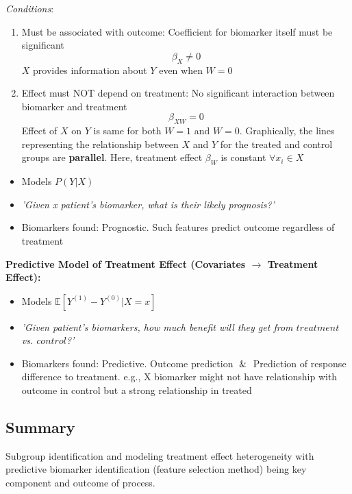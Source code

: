 \documentclass[../main.tex]{subfiles}
\begin{document}
\textit{Conditions}:

\begin{enumerate}
    \item Must be associated with outcome: Coefficient for biomarker itself must be significant
    \[
    \beta_X \neq 0
    \]
    $X$ provides information about $Y$ even when $W=0$
    \item Effect must NOT depend on treatment: No significant interaction between biomarker and treatment
    \[
    \beta_{XW} = 0
    \]
    Effect of $X$ on $Y$ is same for both $W=1$ and $W=0$. Graphically, the lines representing the relationship between $X$ and $Y$ for the treated and control groups are \textbf{parallel}. Here, treatment effect $\beta_W$ is constant $\forall x_i \in X$
\end{enumerate}

 \begin{itemize}
     \item Models $P(Y|X)$
     \item \textit{'Given x patient's biomarker, what is their likely prognosis?'}
     \item Biomarkers found: Prognostic. Such features predict outcome regardless of treatment
 \end{itemize}


 \textbf{Predictive Model of Treatment Effect (Covariates $\rightarrow$ Treatment Effect):} 
 \begin{itemize}
     \item Models $\mathbb{E}[Y^{(1)}-Y^{(0)}|X=x]$
     \item \textit{'Given patient's biomarkers, how much benefit will they get from $treatment$ vs. $control$?'}
     \item Biomarkers found: Predictive. Outcome prediction $\And$ Prediction of response difference to treatment. e.g., X biomarker might not have relationship with  outcome in control but a strong relationship in treated
 \end{itemize}
\subsection*{Summary} Subgroup identification and modeling treatment effect heterogeneity with predictive biomarker identification (feature selection method) being key component and outcome of process. 
 
\end{document}
